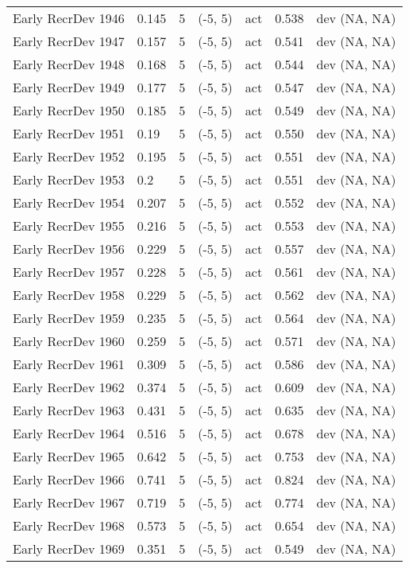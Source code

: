 \documentclass[11pt,
  letterpaper,
]{article}
\begin{document}
\begin{landscape}
\begin{longtable}[t]{>{\raggedright\arraybackslash}p{7.5cm}lllll>{\raggedright\arraybackslash}p{3.5cm}}
Early RecrDev 1946 & 0.145 & 5 & (-5, 5) & act & 0.538 & dev (NA, NA)\\
Early RecrDev 1947 & 0.157 & 5 & (-5, 5) & act & 0.541 & dev (NA, NA)\\
Early RecrDev 1948 & 0.168 & 5 & (-5, 5) & act & 0.544 & dev (NA, NA)\\
Early RecrDev 1949 & 0.177 & 5 & (-5, 5) & act & 0.547 & dev (NA, NA)\\
Early RecrDev 1950 & 0.185 & 5 & (-5, 5) & act & 0.549 & dev (NA, NA)\\
Early RecrDev 1951 & 0.19 & 5 & (-5, 5) & act & 0.550 & dev (NA, NA)\\
Early RecrDev 1952 & 0.195 & 5 & (-5, 5) & act & 0.551 & dev (NA, NA)\\
Early RecrDev 1953 & 0.2 & 5 & (-5, 5) & act & 0.551 & dev (NA, NA)\\
Early RecrDev 1954 & 0.207 & 5 & (-5, 5) & act & 0.552 & dev (NA, NA)\\
Early RecrDev 1955 & 0.216 & 5 & (-5, 5) & act & 0.553 & dev (NA, NA)\\
Early RecrDev 1956 & 0.229 & 5 & (-5, 5) & act & 0.557 & dev (NA, NA)\\
Early RecrDev 1957 & 0.228 & 5 & (-5, 5) & act & 0.561 & dev (NA, NA)\\
Early RecrDev 1958 & 0.229 & 5 & (-5, 5) & act & 0.562 & dev (NA, NA)\\
Early RecrDev 1959 & 0.235 & 5 & (-5, 5) & act & 0.564 & dev (NA, NA)\\
Early RecrDev 1960 & 0.259 & 5 & (-5, 5) & act & 0.571 & dev (NA, NA)\\
Early RecrDev 1961 & 0.309 & 5 & (-5, 5) & act & 0.586 & dev (NA, NA)\\
Early RecrDev 1962 & 0.374 & 5 & (-5, 5) & act & 0.609 & dev (NA, NA)\\
Early RecrDev 1963 & 0.431 & 5 & (-5, 5) & act & 0.635 & dev (NA, NA)\\
Early RecrDev 1964 & 0.516 & 5 & (-5, 5) & act & 0.678 & dev (NA, NA)\\
Early RecrDev 1965 & 0.642 & 5 & (-5, 5) & act & 0.753 & dev (NA, NA)\\
Early RecrDev 1966 & 0.741 & 5 & (-5, 5) & act & 0.824 & dev (NA, NA)\\
Early RecrDev 1967 & 0.719 & 5 & (-5, 5) & act & 0.774 & dev (NA, NA)\\
Early RecrDev 1968 & 0.573 & 5 & (-5, 5) & act & 0.654 & dev (NA, NA)\\
Early RecrDev 1969 & 0.351 & 5 & (-5, 5) & act & 0.549 & dev (NA, NA)\\

\end{longtable}
\end{landscape}
\end{document}
